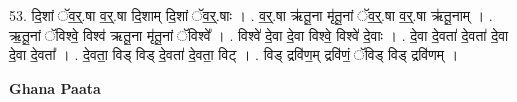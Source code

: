 \documentclass[17pt]{extarticle}
\begin{document}
53. दि॒शां ॅव॒र्॒.षा व॒र्॒.षा दि॒शाम् दि॒शां ॅव॒र्॒.षाः । . व॒र्॒.षा ऋ॑तू॒ना मृ॑तू॒नां ॅव॒र्॒.षा व॒र्॒.षा ऋ॑तू॒नाम् । . ऋ॒तू॒नां ॅविश्वे॒ विश्व॑ ऋतू॒ना मृ॑तू॒नां ॅविश्वे᳚ । . विश्वे॑ दे॒वा दे॒वा विश्वे॒ विश्वे॑ दे॒वाः । . दे॒वा दे॒वता॑ दे॒वता॑ दे॒वा दे॒वा दे॒वता᳚ । . दे॒वता॒ विड् विड् दे॒वता॑ दे॒वता॒ विट् । . विड् द्रवि॑ण॒म् द्रवि॑णं॒ ॅविड् विड् द्रवि॑णम् । \newline

\textbf{Ghana Paata } \newline
\end{document}
